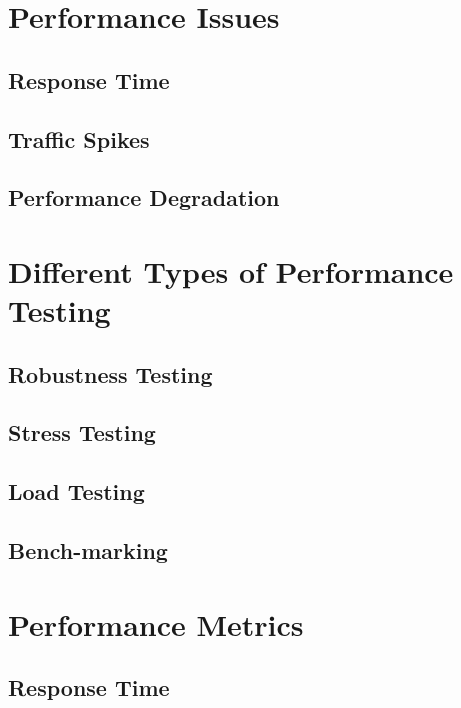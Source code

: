 \section{Performance Issues}
\label{Performance Issues}

\subsection{Response Time}

\subsection{Traffic Spikes}

\subsection{Performance Degradation}

\section{Different Types of Performance Testing}
\label{Different Types of Performance Testing}

\subsection*{Robustness Testing}

\subsection*{Stress Testing}

\subsection*{Load Testing}

\subsection*{Bench-marking}

\section{Performance Metrics}
\label{Performance Metrics}

\subsection{Response Time}

